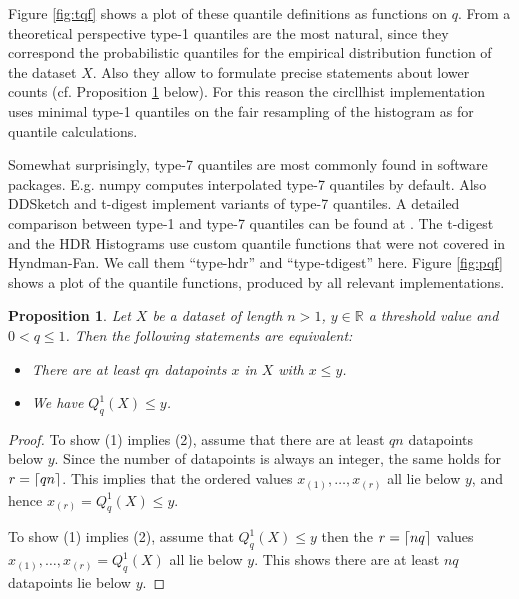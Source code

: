 \documentclass{article}
\DeclarePairedDelimiter{\ceil}{\lceil}{\rceil}
\theoremstyle{plain}
\newtheorem{proposition}[definition]{Proposition}
\theoremstyle{remark}
\newcommand{\IR}{\mathbb{R}}
\begin{document}
Figure \ref{fig:tqf} shows a plot of these quantile definitions as functions on $q$.  From a
theoretical perspective type-1 quantiles are the most natural, since they correspond the
probabilistic quantiles for the empirical distribution function of the dataset $X$.  Also they allow
to formulate precise statements about lower counts (cf. Proposition \ref{prop:count} below).  For
this reason the circllhist implementation uses minimal type-1 quantiles on the fair resampling of
the histogram as for quantile calculations.

Somewhat surprisingly, type-7 quantiles are most commonly found in software packages.
E.g. numpy \cite{numpy} computes interpolated type-7 quantiles by default.
Also DDSketch \cite{dd} and t-digest \cite{tdigest} implement variants of type-7 quantiles.
A detailed comparison between type-1 and type-7 quantiles can be found at \cite{HH19}.
The t-digest and the HDR Histograms use custom quantile functions that were not covered in Hyndman-Fan.
We call them ``type-hdr'' and ``type-tdigest'' here.
Figure \ref{fig:pqf} shows a plot of the quantile functions, produced by all relevant implementations.

\begin{proposition}\label{prop:count}
  Let $X$ be a dataset of length $n > 1$, $y \in \IR$ a threshold value and $0 < q \leq 1$.
  Then the following statements are equivalent:
  \begin{itemize}
  \item[(1)] There are at least $q n$ datapoints $x$ in $X$ with $x \leq y$.
  \item[(2)] We have $Q^1_q(X) \leq y$.
  \end{itemize}
\end{proposition}

\begin{proof}
  To show (1) implies (2), assume that there are at least $q n$ datapoints below $y$.
  Since the number of datapoints is always an integer, the same holds for $r = \ceil{q n}$.
  This implies that the ordered values $x_{(1)}, \dots, x_{(r)}$ all lie below $y$,
  and hence $x_{(r)} = Q^1_q(X) \leq y$.

  To show (1) implies (2), assume that $Q^1_q(X) \leq y$ then the $r = \ceil{n q}$ values $x_{(1)},
  \dots, x_{(r)} = Q^1_q(X)$ all lie below $y$. This shows there are at least $n q$
  datapoints lie below $y$.
\end{proof}
\end{document}
